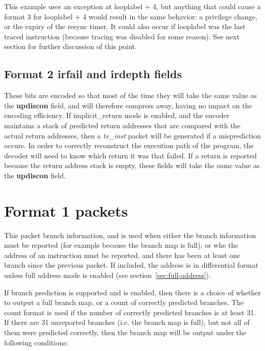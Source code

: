 This example uses an exception at looplabel + 4, but anything that could cause a format 3 for looplabel + 4 would result in 
the same behavior: a privilege change, or the expiry of the resync timer.  It could also occur if looplabel was the last
traced instruction (because tracing was disabled for some reason).  See next section for further discussion of this point.

\subsection{Format 2 \textbf{irfail} and \textbf{irdepth} fields} \label{sec:irxx}
These bits are encoded so that most of the time they will take the same value as the \textbf{updiscon} field,
and will therefore compress away, having no impact on the encoding efficiency.  If implicit\_return mode is enabled, and
the encoder maintains a stack of predicted return addresses that are compared with the actual return addresses, then
a \textit{te\_inst} packet will be generated if a misprediction occurs.  In order to correctly reconstruct the 
execution path of the program, the decoder will need to know which return it was that failed.  If a return is reported
because the return address stack is empty, these fields will take the same value as the \textbf{updiscon} field.

\FloatBarrier
\section{Format 1 packets} \label{sec:format1}

This packet branch information, and is used when either the branch information must be reported 
(for example because the branch map is full), or whe the address of an instruction must be reported, and there has 
been at least one branch since the previous packet.  If included, the address is in differential format unless full 
address mode is enabled (see section~\ref{sec:full-address}).

If branch prediction is supported and is enabled, then there is a choice of whether to output a 
full branch map, or a count of correctly predicted branches.  The count format is used if the number 
of correctly predicted branches is at least 31.  If there are 31 unreported branches (i.e. the branch
map is full), but not all of them were predicted correctly, then the branch map will be output under the following 
conditions:

